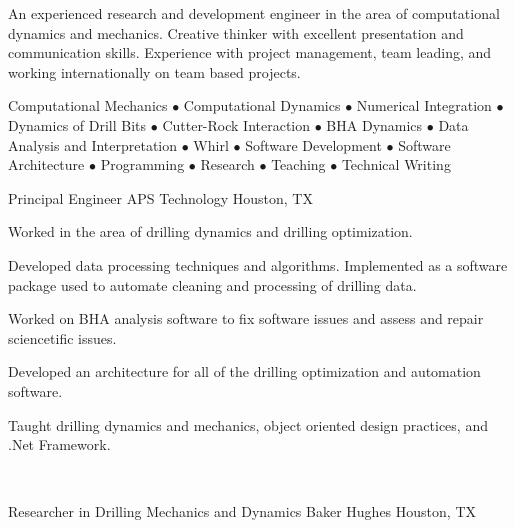 \documentclass{resume}
\begin{document}
	\thispagestyle{lefooterhorizontalline}
	\makeresumeheaderB

	An experienced research and development engineer in the area of computational dynamics and mechanics. Creative thinker with excellent presentation and communication skills. Experience with project management, team leading, and working internationally on team based projects.

	Computational Mechanics $\bullet$ Computational Dynamics $\bullet$ Numerical Integration $\bullet$ Dynamics of Drill Bits $\bullet$ Cutter-Rock Interaction $\bullet$ BHA Dynamics $\bullet$ Data Analysis and Interpretation $\bullet$ Whirl $\bullet$ Software Development $\bullet$ Software Architecture $\bullet$ Programming $\bullet$ Research $\bullet$ Teaching $\bullet$ Technical Writing

    
            {Principal Engineer}
            {APS Technology}
			{Houston, TX}
			
					\vspace*{-6pt}
					\noindent Worked in the area of drilling dynamics and drilling optimization.
		\begin{bulletedlist}
			
		\item 
					Developed data processing techniques and algorithms.  Implemented as a software package used to automate cleaning and processing of drilling data.
				
		\item 
					Worked on BHA analysis software to fix software issues and assess and repair sciencetific issues.
				
		\item 
					Developed an architecture for all of the drilling optimization and automation software.
				
		\item 
					Taught drilling dynamics and mechanics, object oriented design practices, and .Net Framework.
				
		\end{bulletedlist}
			\vspace*{-12pt}
	\hspace*{0pt}\\ \vspace*{-2pt}
				
            {Researcher in Drilling Mechanics and Dynamics}
            {Baker Hughes}
			{Houston, TX}
			
\end{document}
